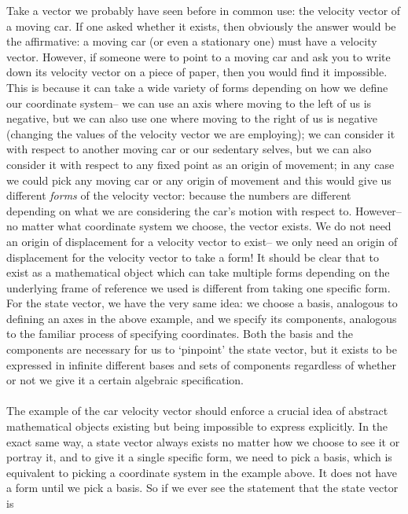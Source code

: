 Take a vector we probably have seen before in common use: the velocity vector of a moving car. If one asked whether it exists, then obviously the answer would be the affirmative: a moving car (or even a stationary one) must have a velocity vector. However, if someone were to point to a moving car and ask you to write down its velocity vector on a piece of paper, then you would find it impossible. This is because it can take a wide variety of forms depending on how we define our coordinate system-- we can use an axis where moving to the left of us is negative, but we can also use one where moving to the right of us is negative (changing the values of the velocity vector we are employing); we can consider it with respect to another moving car or our sedentary selves, but we can also consider it with respect to any fixed point as an origin of movement; in any case we could pick any moving car or any origin of movement and this would give us different \textit{forms} of the velocity vector: because the numbers are different depending on what we are considering the car's motion with respect to. However-- no matter what coordinate system we choose, the vector exists. We do not need an origin of displacement for a velocity vector to exist-- we only need an origin of displacement for the velocity vector to take a form! It should be clear that to exist as a mathematical object which can take multiple forms depending on the underlying frame of reference we used is different from taking one specific form. For the state vector, we have the very same idea: we choose a basis, analogous to defining an axes in the above example, and we specify its components, analogous to the familiar process of specifying coordinates. Both the basis and the components are necessary for us to `pinpoint' the state vector, but it exists to be expressed in infinite different bases and sets of components regardless of whether or not we give it a certain algebraic specification.  %
\\\\
The example of the car velocity vector should enforce a crucial idea of abstract mathematical objects existing but being impossible to express explicitly. In the exact same way, a state vector always exists no matter how we choose to see it or portray it, and to give it a single specific form, we need to pick a basis, which is equivalent to picking a coordinate system in the example above. It does not have a form until we pick a basis. So if we ever see the statement that the state vector is 
